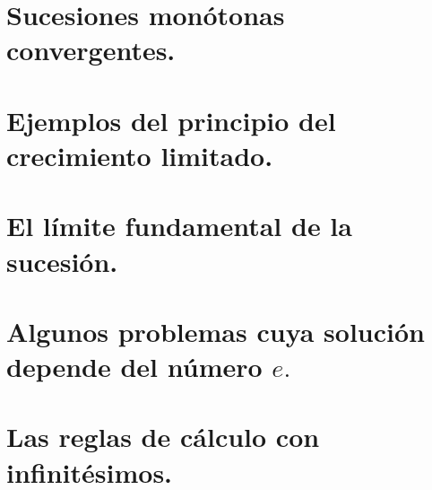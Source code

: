 

\section{Sucesiones monótonas convergentes. }

\section{Ejemplos del principio del crecimiento limitado.}

\section{El límite fundamental de la sucesión.}

\section{Algunos problemas cuya solución depende del número $e.$}

\section{Las reglas de cálculo con infinitésimos. }
